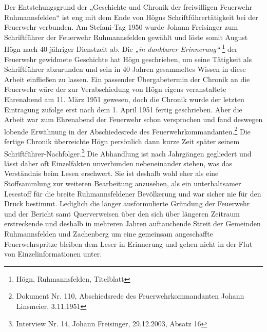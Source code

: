 \documentclass[a4paper]{article}
\newcommand\textstyleZitate[1]{\textit{#1}}
\begin{document}
Der Entstehungsgrund der „Geschichte und Chronik der freiwilligen
Feuerwehr Ruhmannsfelden“ ist eng mit dem Ende von Högns
Schriftführertätigkeit bei der Feuerwehr verbunden. Am Stefani-Tag 1950
wurde Johann Freisinger zum Schriftführer der Feuerwehr Ruhmannsfelden
gewählt und löste somit August Högn nach 40-jähriger Dienstzeit ab. Die
\textstyleZitate{„in dankbarer Erinnerung“}  \footnote{Högn,
Ruhmannsfelden, Titelblatt} der Feuerwehr gewidmete Geschichte hat Högn
geschrieben, um seine Tätigkeit als Schriftführer abzurunden und sein
in 40 Jahren gesammeltes Wissen in diese Arbeit einfließen zu lassen.
Ein passender Übergabetermin der Chronik an die Feuerwehr wäre der zur
Verabschiedung von Högn eigens veranstaltete Ehrenabend am 11. März
1951 gewesen, doch die Chronik wurde der letzten Eintragung zufolge
erst nach dem 1. April 1951 fertig geschrieben. Aber die Arbeit war zum
Ehrenabend der Feuerwehr schon versprochen und fand deswegen lobende
Erwähnung in der Abschiedesrede des Feuerwehrkommandanten.\footnote{
Dokument Nr. 110, Abschiedsrede des Feuerwehrkommandanten Johann
Linsmeier, 3.11.1951} Die fertige Chronik überreichte Högn persönlich
dann kurze Zeit später seinem Schriftführer-Nachfolger.\footnote{
Interview Nr. 14, Johann Freisinger, 29.12.2003, Absatz 16} Die
Abhandlung ist nach Jahrgängen gegliedert und lässt daher oft
Einzelfakten unverbunden nebeneinander stehen, was das Verständnis beim
Lesen erschwert. Sie ist deshalb wohl eher als eine Stoffsammlung zur
weiteren Bearbeitung anzusehen, als ein unterhaltsamer Lesestoff für
die breite Ruhmannsfeldener Bevölkerung und war sicher nie für den
Druck bestimmt. Lediglich die länger ausformulierte Gründung der
Feuerwehr und der Bericht samt Querverweisen über den sich über
längeren Zeitraum erstreckende und deshalb in mehreren Jahren
auftauchende Streit der Gemeinden Ruhmannsfelden und Zachenberg um eine
gemeinsam angeschaffte Feuerwehrspritze bleiben dem Leser in Erinnerung
und gehen nicht in der Flut von Einzelinformationen unter.
\end{document}

